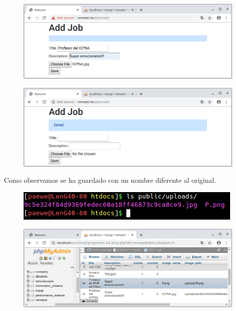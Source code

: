 \documentclass{article}
\begin{document}
\begin{figure}[h!]
  \centering
  \includegraphics[scale=0.5]{./Pictures/189_nuevo_form.png}
\end{figure}

\newpage

\begin{figure}[h!]
  \centering
  \includegraphics[scale=0.5]{./Pictures/190_save_ok.png}
\end{figure}

Como observamos se ha guardado con un nombre diferente al original.\\

\begin{figure}[h!]
  \centering
  \includegraphics[scale=0.75]{./Pictures/193_image_saved_ok.png}
\end{figure}

\begin{figure}[h!]
  \centering
  \includegraphics[scale=0.5]{./Pictures/191_bd_funcional.png}
\end{figure}
\end{document}
